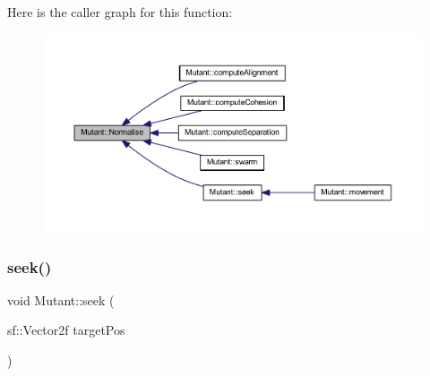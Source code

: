 Here is the caller graph for this function\+:
\nopagebreak
\begin{figure}[H]
\begin{center}
\leavevmode
\includegraphics[width=350pt]{class_mutant_a167cab6fa9c2a19f40c9886f043c1270_icgraph}
\end{center}
\end{figure}
\mbox{\label{class_mutant_a24699eb054b6cf95f66bf3e856364b71}} 
\subsubsection{\texorpdfstring{seek()}{seek()}}
{\footnotesize\ttfamily void Mutant\+::seek (\begin{DoxyParamCaption}\item[{sf\+::\+Vector2f}]{target\+Pos }\end{DoxyParamCaption})}

